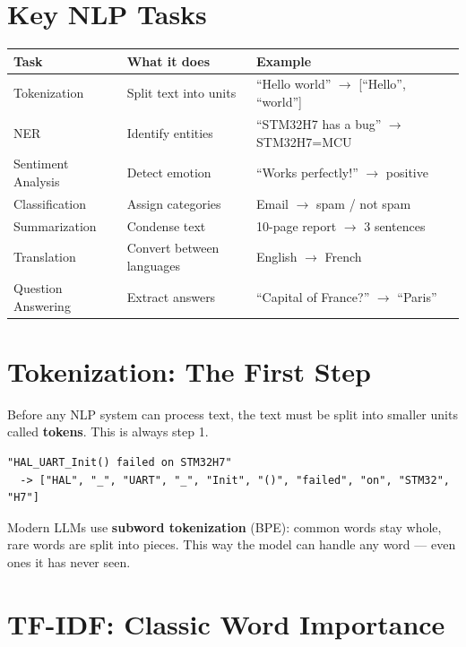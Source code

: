 \documentclass[11pt,a4paper]{report}
\begin{document}
\section{Key NLP Tasks}

\begin{table}[h]
\centering
\begin{tabularx}{\textwidth}{l X X}
\toprule
\textbf{Task} & \textbf{What it does} & \textbf{Example} \\
\midrule
Tokenization & Split text into units & ``Hello world'' $\rightarrow$ [``Hello'', ``world''] \\
NER & Identify entities & ``STM32H7 has a bug'' $\rightarrow$ STM32H7=MCU \\
Sentiment Analysis & Detect emotion & ``Works perfectly!'' $\rightarrow$ positive \\
Classification & Assign categories & Email $\rightarrow$ spam / not spam \\
Summarization & Condense text & 10-page report $\rightarrow$ 3 sentences \\
Translation & Convert between languages & English $\rightarrow$ French \\
Question Answering & Extract answers & ``Capital of France?'' $\rightarrow$ ``Paris'' \\
\bottomrule
\end{tabularx}
\end{table}

\section{Tokenization: The First Step}

Before any NLP system can process text, the text must be split into smaller units called \textbf{tokens}. This is always step 1.

\begin{lstlisting}
"HAL_UART_Init() failed on STM32H7"
  -> ["HAL", "_", "UART", "_", "Init", "()", "failed", "on", "STM32", "H7"]
\end{lstlisting}

Modern LLMs use \textbf{subword tokenization} (BPE): common words stay whole, rare words are split into pieces. This way the model can handle any word --- even ones it has never seen.

\section{TF-IDF: Classic Word Importance}
\end{document}
